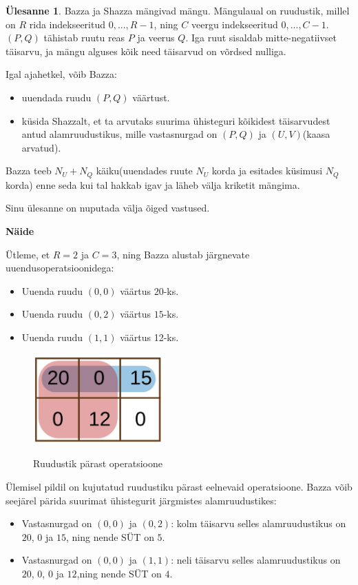 \documentclass{trkut}
\theoremstyle{definition}
\newtheorem*{Text}{Ülesanne}
\begin{document}
\begin{Text}
Bazza ja Shazza mängivad mängu. Mängulaual on ruudustik, millel on $R$ rida indekseeritud $0,...,R-1$, ning $C$ veergu indekseeritud $0,...,C-1$. $(P,Q)$ tähistab ruutu reas $P$ ja veerus $Q$. Iga ruut sisaldab mitte-negatiivset täisarvu, ja mängu alguses kõik need täisarvud on võrdsed nulliga.

Igal ajahetkel, võib Bazza:
\begin{itemize}
    \item uuendada ruudu $(P, Q)$ väärtust.
    \item küsida Shazzalt, et ta arvutaks suurima ühisteguri kõikidest täisarvudest antud alamruudustikus, mille vastasnurgad on $(P,Q)$ ja $(U,V)$(kaasa arvatud).
\end{itemize}

Bazza teeb $N_U+N_Q$ käiku(uuendades ruute $N_U$ korda ja esitades küsimusi $N_Q$ korda) enne seda kui tal hakkab igav ja läheb välja kriketit mängima.

Sinu ülesanne on nuputada välja õiged vastused.

\textbf{Näide}

Ütleme, et $R=2$ ja $C=3$, ning Bazza alustab järgnevate uuendusoperatsioonidega:
\begin{itemize}
    \item Uuenda ruudu $(0,0)$ väärtus $20$-ks.
    \item Uuenda ruudu $(0,2)$ väärtus $15$-ks.
    \item Uuenda ruudu $(1,1)$ väärtus 12-ks.
\end{itemize}

\begin{figure}[H]%
    \includegraphics[width=5cm]{ioiruut1.png}%
    \caption{Ruudustik pärast operatsioone}%
    \label{CPH}%
\end{figure}
Ülemisel pildil on kujutatud ruudustiku pärast eelnevaid operatsioone. Bazza võib seejärel pärida suurimat ühistegurit järgmistes alamruudustikes:
\begin{itemize}
    \item Vastasnurgad on $(0,0)$ ja $(0,2)$: kolm täisarvu selles alamruudustikus on $20$, $0$ ja $15$, ning nende SÜT on $5$.
    \item Vastasnurgad on $(0,0)$ ja $(1,1)$: neli täisarvu selles alamruudustikus on $20$, $0$, $0$ ja $12$,ning nende SÜT on $4$.
\end{itemize}


\end{Text}
\end{document}

